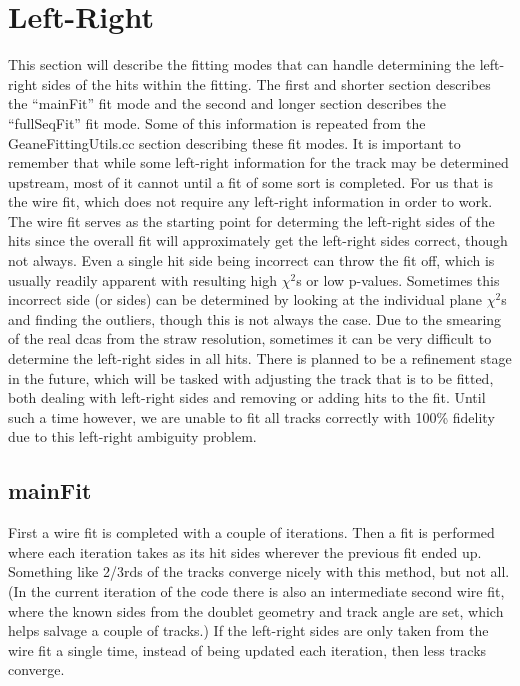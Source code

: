 \section{Left-Right}
\label{sec:LR}

	This section will describe the fitting modes that can handle determining the left-right sides of the hits within the fitting. The first and shorter section describes the ``mainFit'' fit mode and the second and longer section describes the ``fullSeqFit'' fit mode. Some of this information is repeated from the GeaneFittingUtils.cc section describing these fit modes. It is important to remember that while some left-right information for the track may be determined upstream, most of it cannot until a fit of some sort is completed. For us that is the wire fit, which does not require any left-right information in order to work. The wire fit serves as the starting point for determing the left-right sides of the hits since the overall fit will approximately get the left-right sides correct, though not always. Even a single hit side being incorrect can throw the fit off, which is usually readily apparent with resulting high $\chi^{2}$s or low p-values. Sometimes this incorrect side (or sides) can be determined by looking at the individual plane $\chi^{2}$s and finding the outliers, though this is not always the case. Due to the smearing of the real dcas from the straw resolution, sometimes it can be very difficult to determine the left-right sides in all hits. There is planned to be a refinement stage in the future, which will be tasked with adjusting the track that is to be fitted, both dealing with left-right sides and removing or adding hits to the fit. Until such a time however, we are unable to fit all tracks correctly with 100\% fidelity due to this left-right ambiguity problem.

	\subsection{mainFit}

	  First a wire fit is completed with a couple of iterations. Then a fit is performed where each iteration takes as its hit sides wherever the previous fit ended up. Something like 2/3rds of the tracks converge nicely with this method, but not all. (In the current iteration of the code there is also an intermediate second wire fit, where the known sides from the doublet geometry and track angle are set, which helps salvage a couple of tracks.) If the left-right sides are only taken from the wire fit a single time, instead of being updated each iteration, then less tracks converge.

